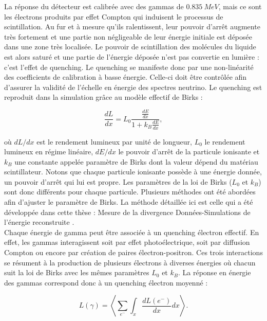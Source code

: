 La réponse du détecteur est calibrée avec des gammas de $\SI{0.835}{MeV}$, mais ce sont les électrons produits par effet Compton qui induisent le processus de scintillation. Au fur et à mesure qu'ils ralentissent, leur pouvoir d'arrêt augmente très fortement  et une partie non négligeable de leur énergie initiale est déposée dans une zone très localisée. Le pouvoir de scintillation des molécules du liquide est alors saturé et une partie de l'énergie déposée n'est pas convertie en lumière : c'est l'effet de quenching. Le quenching se manifeste donc par une non-linéarité des coefficients de calibration à basse énergie. Celle-ci doit être contrôlée afin d'assurer la validité de l'échelle en énergie des spectres neutrino. Le quenching est reproduit dans la simulation grâce au modèle effectif de Birks \cite{Birks:1951boa}:

\begin{equation}
    \frac{dL}{dx} = L_0 \frac{\frac{dE}{dx}}{1 + k_B\frac{dE}{dx}},
\end{equation}

\bigbreak

où $dL/dx$ est le rendement lumineux par unité de longueur, $L_0$ le rendement lumineux en régime linéaire, $dE/dx$ le pouvoir d'arrêt de la particule ionisante et $k_B$ une constante appelée \og paramètre de Birks \fg{} dont la valeur dépend du matériau scintillateur. Notons que chaque particule ionisante possède à une énergie donnée, un pouvoir d'arrêt qui lui est propre. Les paramètres de la loi de Birks ($L_0$ et $k_B$) sont donc différents pour chaque particule. Plusieurs méthodes ont été abordées afin d'ajuster le paramètre de Birks. La méthode détaillée ici est celle qui a été développée dans cette thèse : \og Mesure de la divergence Données-Simulations de l'énergie reconstruite\fg{} \cite{docdb468}.\\

Chaque énergie de gamma peut être associée à un quenching électron effectif. En effet, les gammas interagissent soit par effet photoélectrique, soit par diffusion Compton ou encore par création de paires électron-positron. Ces trois interactions se résument à la production de plusieurs électrons à diverses énergies où chacun suit la loi de Birks avec les mêmes paramètres $L_0$ et $k_B$. La réponse en énergie des gammas correspond donc à un quenching électron moyenné :

\begin{equation}
    L(\gamma) = \left<\sum_{e^-} \int_x \frac{dL(e^-)}{dx}dx \right>.
\end{equation}


